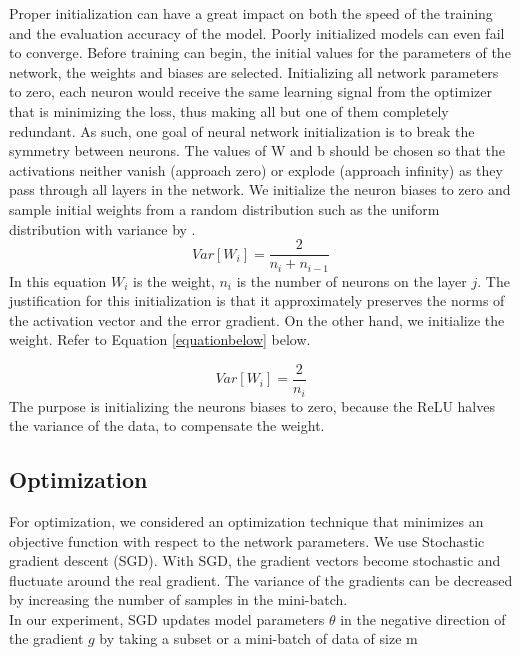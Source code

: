 Proper initialization can have a
great impact on both the speed of the training and the evaluation accuracy
of the model. Poorly initialized models can even fail to converge. Before training can begin, the initial values for the parameters of the network,
the weights and biases are selected. 
Initializing all network parameters to zero, each neuron would
receive the same learning signal from the optimizer that is minimizing the
loss, thus making all but one of them completely redundant. As such, one
goal of neural network initialization is to break the symmetry between neurons. The values of W and b should be chosen so that the activations neither
vanish (approach zero) or explode (approach infinity) as they pass through
all layers in the network. We initialize the
neuron biases to zero and sample initial weights from a random distribution
such as the uniform distribution with variance by \cite{glorot2010understanding}.
\begin{equation}
    Var[W_{i}]=\frac{2}{n_{i}+n_{i-1}}
\end{equation}
In this equation $W_{i}$ is the weight, $n_{i}$ is the number of neurons on the layer $j$. The justification for this initialization is that it approximately preserves the norms of the activation vector and the error gradient. On the other hand, we initialize the weight. Refer to Equation \ref{equationbelow} below.

\begin{equation}\label{equationbelow}
     Var[W_{i}]=\frac{2}{n_{i}}
\end{equation}
The purpose is initializing the neurons biases to zero, because the ReLU halves the variance of the data, to compensate the weight.

\subsection{Optimization}
For optimization, we considered an optimization technique that minimizes an objective function with respect to the network parameters. We use Stochastic gradient descent (SGD). With SGD, the gradient vectors become stochastic and fluctuate around
the real gradient. The variance of the gradients can be decreased by increasing the number of samples in the mini-batch.\\

In our experiment, SGD updates model parameters $\theta$ in the negative direction of the gradient $g$ by taking a subset or a mini-batch of data of size m


